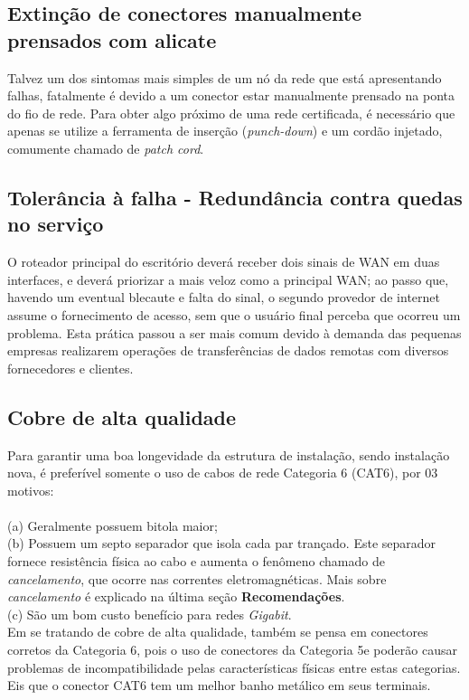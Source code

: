 \documentclass[	DIV=calc,%
							paper=a4,%
							fontsize=12pt,%
							onecolumn]{scrartcl}	 					%
\begin{document}
\subsection{Extinção de conectores manualmente prensados com alicate}
Talvez um dos sintomas mais simples de um nó da rede que está apresentando falhas, fatalmente é devido a um conector estar manualmente prensado na ponta do fio de rede. Para obter algo próximo de uma rede certificada, é necessário que apenas se utilize a ferramenta de inserção (\textit{punch-down}) e um cordão injetado, comumente chamado de \textit{patch cord}.

\subsection{Tolerância à falha - Redundância contra quedas no serviço}
O roteador principal do escritório deverá receber dois sinais de WAN em duas interfaces, e deverá priorizar a mais veloz como a principal WAN; ao passo que, havendo um eventual blecaute e falta do sinal, o segundo provedor de internet assume o fornecimento de acesso, sem que o usuário final perceba que ocorreu um problema. Esta prática passou a ser mais comum devido à demanda das pequenas empresas realizarem operações de transferências de dados remotas com diversos fornecedores e clientes.

\subsection{Cobre de alta qualidade}
Para garantir uma boa longevidade da estrutura de instalação, sendo instalação nova, é preferível somente o uso de cabos de rede Categoria 6 (CAT6), por 03 motivos: \\ \\
(a) Geralmente possuem bitola maior;\\
(b) Possuem um septo separador que isola cada par trançado. Este separador fornece resistência física ao cabo e aumenta o fenômeno chamado de \textit{cancelamento}, que ocorre nas correntes eletromagnéticas. Mais sobre \textit{cancelamento} é explicado na última seção \textbf{Recomendações}.\\
(c) São um bom custo benefício para redes \textit{Gigabit}.\\

Em se tratando de cobre de alta qualidade, também se pensa em conectores corretos da Categoria 6, pois o uso de conectores da Categoria 5e poderão causar problemas de incompatibilidade pelas características físicas entre estas categorias. Eis que o conector CAT6 tem um melhor banho metálico em seus terminais.
\end{document}
